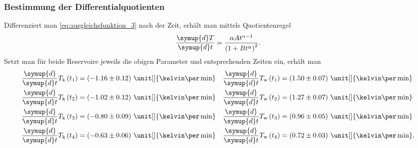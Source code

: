 \subsubsection[]{Bestimmung der Differentialquotienten}
\label{sec: dif_quot}
Differenziert man \eqref{eq:ausgleichsfunktion_3} nach der Zeit, erhält man mittels Quotientenregel
\begin{align*}
    \frac{\symup{d}T}{\symup{d}t} = \frac{\alpha A t^{\alpha -1}}{\left(1 + B t^{\alpha}\right)^2}.
\end{align*}
%
Setzt man für beide Reservoire jeweils die obigen Parameter und entsprechenden Zeiten ein, erhält man 
\begin{align*}
    \frac{\symup{d}}{\symup{d}t} T_\text{k} \left(t_1\right) &= \left( -1.16 \pm 0.12 \right)\, \unit[]{\kelvin\per\min}  &
    \frac{\symup{d}}{\symup{d}t} T_\text{w} \left(t_1\right) &= \left(  1.50 \pm 0.07 \right)\, \unit[]{\kelvin\per\min}   \\
    \frac{\symup{d}}{\symup{d}t} T_\text{k} \left(t_2\right) &= \left( -1.02 \pm 0.12 \right)\, \unit[]{\kelvin\per\min}  &
    \frac{\symup{d}}{\symup{d}t} T_\text{w} \left(t_2\right) &= \left(  1.27 \pm 0.07 \right)\, \unit[]{\kelvin\per\min} \\
    \frac{\symup{d}}{\symup{d}t} T_\text{k} \left(t_3\right) &= \left( -0.80 \pm 0.09 \right)\, \unit[]{\kelvin\per\min} &
    \frac{\symup{d}}{\symup{d}t} T_\text{w} \left(t_3\right) &= \left(  0.96 \pm 0.05 \right)\, \unit[]{\kelvin\per\min} \\
    \frac{\symup{d}}{\symup{d}t} T_\text{k} \left(t_4\right) &= \left( -0.63 \pm 0.06 \right)\, \unit[]{\kelvin\per\min}  &
    \frac{\symup{d}}{\symup{d}t} T_\text{w} \left(t_4\right) &= \left(  0.72 \pm 0.03 \right)\, \unit[]{\kelvin\per\min}.
\end{align*}
%

